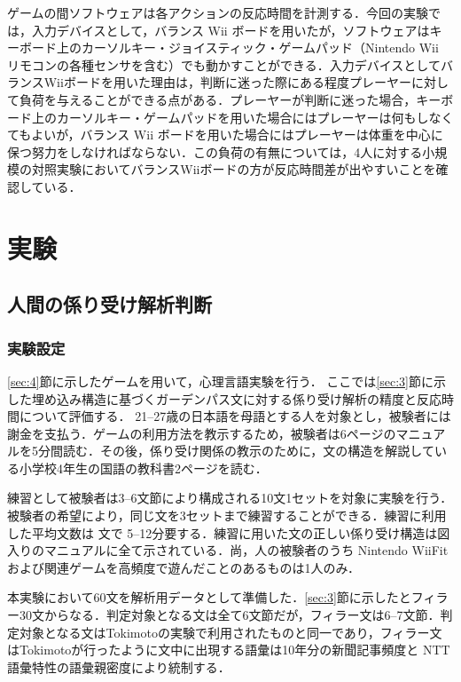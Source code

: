 \documentclass[japanese]{jnlp_1.4}
\def\modified#1{}
\def\mmodified#1{}
\begin{document}
ゲームの間ソフトウェアは各アクションの反応時間を計測する．今回の実験では，入力デバイスとして，バランス Wii ボードを用いたが，ソフトウェアはキーボード上のカーソルキー・ジョイスティック・ゲームパッド（Nintendo Wii リモコンの各種センサを含む）でも動かすことができる．入力デバイスとしてバランスWiiボードを用いた理由は，判断に迷った際にある程度プレーヤーに対して負荷を与えることができる点がある．プレーヤーが判断に迷った場合，キーボード上のカーソルキー・ゲームパッドを用いた場合にはプレーヤーは何もしなくてもよいが，バランス Wii ボードを用いた場合にはプレーヤーは体重を中心に保つ努力をしなければならない．この負荷の有無については，4人に対する小規模の対照実験においてバランスWiiボードの方が反応時間差が出やすいことを確認している．



\section{実験 \label{sec:5}}

\subsection{人間の係り受け解析判断 \label{subsec:5.1}}

\subsubsection{実験設定}

\ref{sec:4}節に示したゲームを用いて，心理言語実験を行う．
ここでは\ref{sec:3}節に示した埋め込み構造に基づくガーデンパス文に対する係り受け解析の精度と反応時間について評価する．
21--27歳の日本語を母語とする\mmodified{大学生・大学院生13}人を対象とし，被験者には謝金を支払う．ゲームの利用方法を教示するため，被験者は6ページのマニュアルを5分間読む．その後，係り受け関係の教示のために，文の構造を解説している小学校4年生の国語の教科書2ページを読む．\modified{教示時には速度と正解率の両方を計測していることを被験者に伝え，速く・正確に解析を行うことを依頼する．ゲーム中は各文が正解しているか否かのみを提示する．}

練習として被験者は3--6文節により構成される10文1セットを対象に実験を行う．被験者の希望により，同じ文を3セットまで練習することができる．練習に利用した平均文数は \mmodified{16.9}文で 5--12分要する．練習に用いた文の正しい係り受け構造は図入りのマニュアルに全て示されている．尚，\mmodified{13}人の被験者のうち Nintendo WiiFit および関連ゲームを高頻度で遊んだことのあるものは1人のみ．

本実験において60文を解析用データとして準備した．\ref{sec:3}節に示した\modified{判定対象となる3種類の例文(CTRL・EB・LB) 10文ずつ計30文}とフィラー30文からなる．判定対象となる文は全て6文節だが，フィラー文は6--7文節．判定対象となる文はTokimotoの実験で利用されたものと同一であり，フィラー文はTokimotoが行ったように文中に出現する語彙は10年分の新聞記事頻度と NTT語彙特性\cite{Goitokusei}の語彙親密度により統制する．
\end{document}
